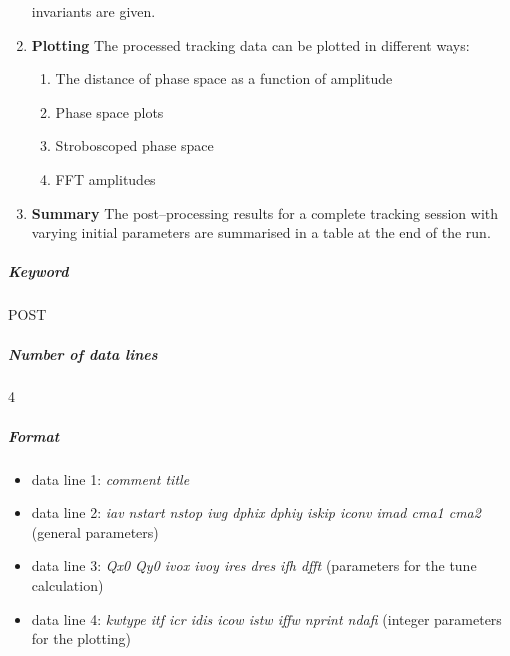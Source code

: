 \documentclass[a4paper,11pt]{report}
\begin{document}
\begin{enumerate}
  invariants are given.
\item {\bf Plotting} The processed tracking data can be plotted in
  different ways:
 \begin{enumerate}
 \item The distance of phase space as a function of amplitude
 \item Phase space plots
 \item Stroboscoped phase space
 \item FFT amplitudes
 \end{enumerate}
\item {\bf Summary} The post--processing results for a complete
  tracking session with varying initial parameters are summarised in a
  table at the end of the run.
\end{enumerate}

\subparagraph{Keyword} POST \subparagraph{Number of data lines} 4

\subparagraph{Format}
\begin{itemize}
\item data line 1: {\em comment title}
\item data line 2: {\em iav nstart nstop iwg dphix dphiy iskip iconv
    imad cma1 cma2} \/(general parameters)
\item data line 3: {\em Qx0 Qy0 ivox ivoy ires dres ifh dfft}
  \/(parameters for the tune calculation)
\item data line 4: {\em kwtype itf icr idis icow istw iffw nprint
    ndafi} \/(integer parameters for the plotting)
\end{itemize}
\end{document}

